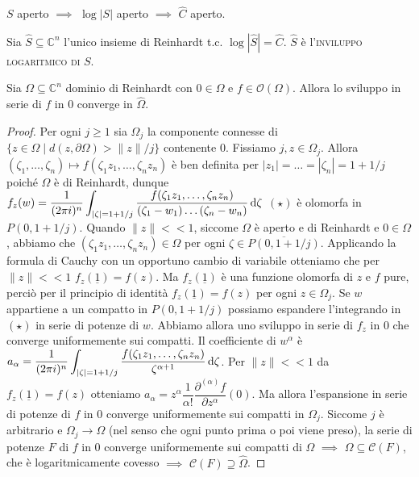 \begin{oss}
  $S$ aperto $\implies$ $\log{|S|}$ aperto $\implies$ $\hat{C}$ aperto.
\end{oss}

\begin{defn}
  Sia $\hat{S} \subseteq \mathbb{C}^n$ l'unico insieme di Reinhardt t.c. $\log{|\hat{S}|}=\hat{C}$. $\hat{S}$ è l'\textsc{inviluppo logaritmico di $S$}.
\end{defn}

\begin{prop}
  Sia $\Omega \subseteq \mathbb{C}^n$ dominio di Reinhardt con $0 \in \Omega$ e $f \in \mathcal{O}(\Omega)$. Allora lo sviluppo in serie di $f$ in $0$ converge in $\hat{\Omega}$.
\end{prop}

\begin{proof}
  Per ogni $j \ge 1$ sia $\Omega_j$ la componente connesse di $\{z \in \Omega \mid d(z,\partial\Omega)>\|z\|/j\}$ contenente $0$. Fissiamo $j, z \in \Omega_j$.
  Allora $(\zeta_1, \dots, \zeta_n) \longmapsto f(\zeta_1z_1,\dots,\zeta_nz_n)$ è ben definita per $|z_1|=\dots=|\zeta_n|=1+1/j$ poiché $\Omega$ è di Reinhardt, dunque $\displaystyle f_z(w)=\frac{1}{(2\pi i)^n} \int_{|\zeta|=1+1/j} \frac{f(\zeta_1z_1, \dots, \zeta_nz_n)}{(\zeta_1-w_1)\dots(\zeta_n-w_n)}\mathop{}\!\mathrm{d} \zeta$ $(\star)$ è olomorfa in $P(0, 1+1/j)$.
  Quando $\|z\|<<1$, siccome $\Omega$ è aperto e di Reinhardt e $0 \in \Omega$, abbiamo che $(\zeta_1z_1,\dots,\zeta_nz_n) \in \Omega$  per ogni $\zeta \in \overline{P(0,1+1/j)}$. Applicando la formula di Cauchy con un opportuno cambio di variabile otteniamo che per $\|z\| << 1$ $f_z(\underline{1})=f(z)$.
  Ma $f_z(\underline{1})$ è una funzione olomorfa di $z$ e $f$ pure, perciò per il principio di identità $f_z(\underline{1})=f(z)$ per ogni $z \in \Omega_j$. Se $w$ appartiene a un compatto in $P(0, 1+1/j)$ possiamo espandere l'integrando in $(\star)$ in serie di potenze di $w$. Abbiamo allora uno sviluppo in serie di $f_z$ in $0$ che converge uniformemente sui compatti.
  Il coefficiente di $w^\alpha$ è $\displaystyle a_{\alpha}=\frac{1}{(2\pi i)^n}\int_{|\zeta|=1+1/j} \frac{f(\zeta_1z_1,\dots,\zeta_nz_n)}{\zeta^{\alpha+1}}\mathop{}\!\mathrm{d}\zeta$. Per $\|z\|<<1$ da $f_z(\underline{1})=f(z)$ otteniamo $a_\alpha=z^\alpha\dfrac{1}{\alpha!}\dfrac{\partial^{(\alpha)}f}{\partial z^\alpha}(0)$.
  Ma allora l'espansione in serie di potenze di $f$ in $0$ converge uniformemente sui compatti in $\Omega_j$. Siccome $j$ è arbitrario e $\Omega_j \longrightarrow \Omega$ (nel senso che ogni punto prima o poi viene preso), la serie di potenze $F$ di $f$ in $0$ converge uniformemente sui compatti di $\Omega$ $\implies$ $\Omega \subseteq \mathcal{C}(F)$, che è logaritmicamente covesso $\implies$ $\mathcal{C}(F) \supseteq \hat{\Omega}$.
\end{proof}
